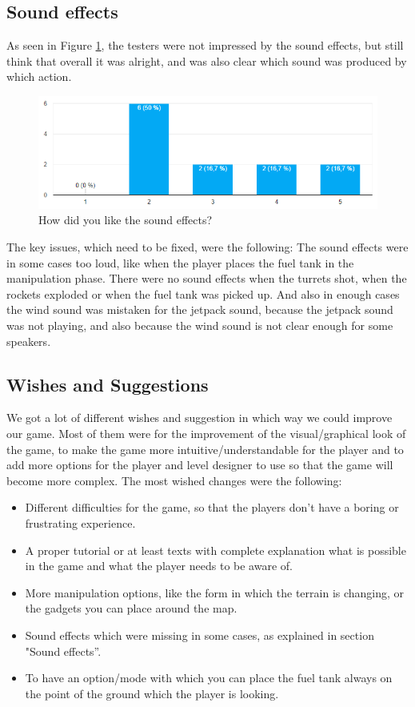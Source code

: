 \documentclass[12pt, letterpaper]{scrartcl}
\begin{document}
	 \subsection{Sound effects}
	 As seen in Figure \ref{fig:sound}, the testers were not impressed by the sound effects, but still think that overall it was alright, and was also clear which sound was produced by which action.
	 
	 \begin{figure}[H]
	 	\centering
	 	\includegraphics[width=\textwidth]{images/playtesting/sound}
	 	\caption{How did you like the sound effects?}
	 	\label{fig:sound}
	 \end{figure}
	 
	 The key issues, which need to be fixed, were the following: The sound effects were in some cases too loud, like when the player places the fuel tank in the manipulation phase. There were no sound effects when the turrets shot, when the rockets exploded or when the fuel tank was picked up. And also in enough cases the wind sound was mistaken for the jetpack sound, because the jetpack sound was not playing, and also because the wind sound is not clear enough for some speakers.
	 
	 \subsection{Wishes and Suggestions}
	 We got a lot of different wishes and suggestion in which way we could improve our game. Most of them were for the improvement of the visual/graphical look of the game, to make the game more intuitive/understandable for the player and to add more options for the player and level designer to use so that the game will become more complex.
	 \bigbreak
	 The most wished changes were the following:
	 \begin{itemize}
	 \item Different difficulties for the game, so that the players don't have a boring or frustrating experience.	
	 \item A proper tutorial or at least texts with complete explanation what is possible in the game and what the player needs to be aware of.
	 \item More manipulation options, like the form in which the terrain is changing, or the gadgets you can place around the map.
	 \item Sound effects which were missing in some cases, as explained in section "Sound effects”.
	 \item To have an option/mode with which you can place the fuel tank always on the point of the ground which the player is looking.
	 \end{itemize}
	 
\end{document}
